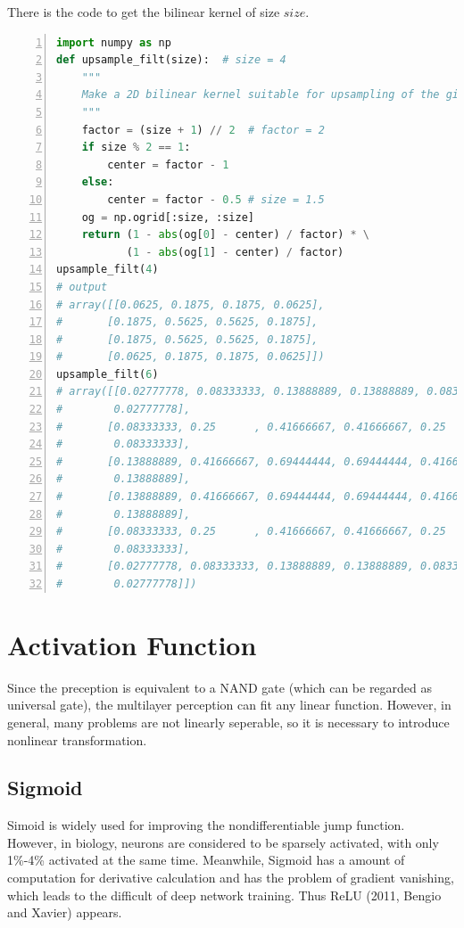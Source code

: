 \documentclass[10pt,onecolumn]{book}
\begin{document}
There is the code to get the bilinear kernel of size $size$.

\begin{tcolorbox}  
\begin{lstlisting}[language={Python},numbers=left,numberstyle=\tiny,%frame=shadowbox,  
   rulesepcolor=\color{red!20!green!20!blue!20},  
   keywordstyle=\color{blue!70!black},  
   commentstyle=\color{blue!90!},  
   basicstyle=\ttfamily]  
import numpy as np
def upsample_filt(size):  # size = 4 
    """
    Make a 2D bilinear kernel suitable for upsampling of the given (h, w) size.
    """
    factor = (size + 1) // 2  # factor = 2
    if size % 2 == 1:
        center = factor - 1  
    else:
        center = factor - 0.5 # size = 1.5
    og = np.ogrid[:size, :size] 
    return (1 - abs(og[0] - center) / factor) * \
           (1 - abs(og[1] - center) / factor)
upsample_filt(4)
# output
# array([[0.0625, 0.1875, 0.1875, 0.0625],
#       [0.1875, 0.5625, 0.5625, 0.1875],
#       [0.1875, 0.5625, 0.5625, 0.1875],
#       [0.0625, 0.1875, 0.1875, 0.0625]])
upsample_filt(6)
# array([[0.02777778, 0.08333333, 0.13888889, 0.13888889, 0.08333333,
#        0.02777778],
#       [0.08333333, 0.25      , 0.41666667, 0.41666667, 0.25      ,
#        0.08333333],
#       [0.13888889, 0.41666667, 0.69444444, 0.69444444, 0.41666667,
#        0.13888889],
#       [0.13888889, 0.41666667, 0.69444444, 0.69444444, 0.41666667,
#        0.13888889],
#       [0.08333333, 0.25      , 0.41666667, 0.41666667, 0.25      ,
#        0.08333333],
#       [0.02777778, 0.08333333, 0.13888889, 0.13888889, 0.08333333,
#        0.02777778]])
\end{lstlisting} 
\end{tcolorbox}

\section{Activation Function}
Since the preception is equivalent to a NAND gate (which can be regarded as universal gate), the multilayer perception can fit any linear function. However, in general, many problems are not linearly seperable, so it is necessary to introduce nonlinear transformation.

\subsection{Sigmoid}
Simoid is widely used for improving the nondifferentiable jump function. However, in biology, neurons are considered to be sparsely activated, with only 1\%-4\% activated at the same time. Meanwhile, Sigmoid has a amount of computation for derivative calculation and has the problem of gradient vanishing, which leads to the difficult of deep network training. Thus ReLU (2011, Bengio and Xavier) appears.
\end{document}
